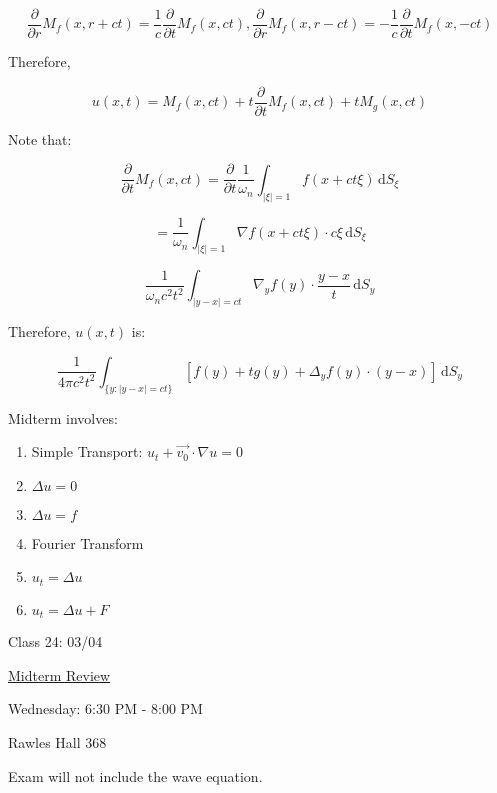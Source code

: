 \documentclass{article}
\theoremstyle{definition}
\begin{document}
\[
    \frac{\partial}{\partial r} M_f(x,r+ct) = \frac{1}{c} \frac{\partial}{\partial t} M_f(x,ct), \frac{\partial}{\partial r} M_f(x,r-ct) = -\frac{1}{c} \frac{\partial}{\partial t} M_f(x,-ct)
\]

Therefore,

\[
    u(x,t) = M_f(x,ct) + t \frac{\partial}{\partial t} M_f(x,ct) + t M_g(x,ct)
\]

Note that:

\[
    \frac{\partial}{\partial t} M_f(x,ct) = \frac{\partial}{\partial t} \frac{1}{\omega_n} \int_{\vert \xi \vert = 1}^{} f(x+ct\xi) \,\mathrm{d}S_\xi 
\]

\[
    = \frac{1}{\omega_n} \int_{\vert \xi  \vert = 1}^{} \nabla f(x+ct\xi)\cdot c\xi \,\mathrm{d}S_\xi 
\]

\[
    \frac{1}{\omega_n c^2 t^2} \int_{\vert y - x \vert = ct}^{} \nabla_y f(y) \cdot \frac{y-x}{t} \,\mathrm{d}S_y 
\]

Therefore, \(u(x,t) \) is:

\[
    \frac{1}{4 \pi c^2 t^2} \int_{\{y:\vert y - x \vert = ct\}}^{} \left[ f(y) + t g(y)+\Delta_y f(y)\cdot (y-x) \right]  \,\mathrm{d}S_y 
\]

\pagebreak

Midterm involves:

\begin{enumerate}
    \item Simple Transport: \(u_t +\vec{v_0} \cdot \nabla u = 0\) 
    \item \(\Delta u = 0\) 
    \item \(\Delta u = f\) 
    \item Fourier Transform
    \item \(u_t = \Delta u\) 
    \item \(u_t = \Delta u + F\) 
\end{enumerate}

\hrulefill

Class 24: 03/04

\underline{Midterm Review}

Wednesday: 6:30 PM - 8:00 PM

Rawles Hall 368

Exam will not include the wave equation.
\end{document}

